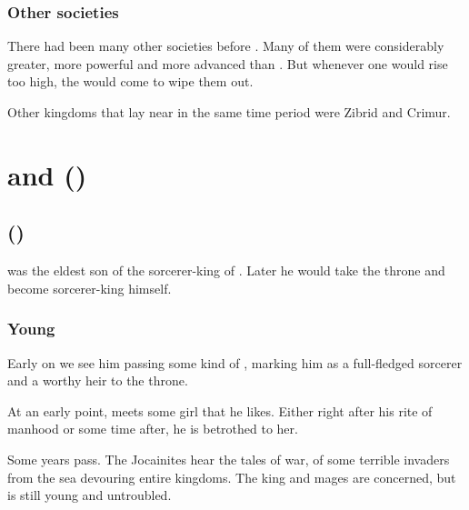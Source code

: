\subsubsection{Other \nephilic{} societies}
There had been many other \nephilic{} societies before \Numah. 
Many of them were considerably greater, more powerful and more advanced than \Numah. 
But whenever one would rise too high, the \scathae{} would come to wipe them out. 

Other kingdoms that lay near \Numah in the same time period were Zibrid and Crimur. 















\section[Semiza and Ilu (\yds{Semiza birth})]{\Semiza{} and \Ilu ()}










\subsection[Semiza (\yds{Semiza birth})]{\Semiza ()}
\Semiza{} was the eldest son of the \nephil{} sorcerer-king of \Numah. 
Later he would take the throne and become sorcerer-king himself. 





\subsubsection{Young \Semiza}
Early on we see him passing some kind of , marking him as a full-fledged sorcerer and a worthy heir to the throne. 

At an early point, \Semiza{} meets some girl that he likes. 
Either right after his rite of manhood or some time after, he is betrothed to her. 

Some years pass. 
The Jocainites hear the tales of war, of some terrible invaders from the sea devouring entire kingdoms. 
The king and mages are concerned, but \Semiza{} is still young and untroubled. 

